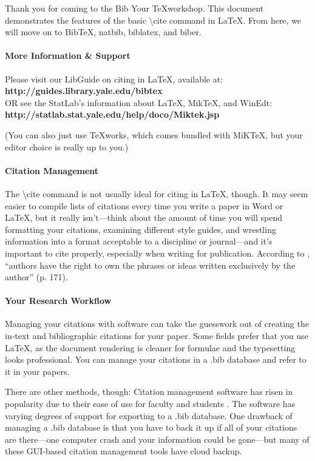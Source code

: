 \documentclass[12pt]{report}
\begin{document}
Thank you for coming to the Bib Your \TeX \space workshop. This document demonstrates the features of the basic \textbackslash cite command in \LaTeX. From here, we will move on to Bib\TeX, natbib, biblatex, and biber. 

\paragraph{More Information \& Support}
Please visit our LibGuide on citing in La\TeX, available at:
\\ \textbf{http://guides.library.yale.edu/bibtex}
\\ OR
see the StatLab's information about \LaTeX, Mik\TeX, and WinEdt:
\\ \textbf{http://statlab.stat.yale.edu/help/doco/Miktek.jsp}

(You can also just use \TeX works, which comes bundled with MiK\TeX, but your editor choice is really up to you.)

\paragraph{Citation Management}

The \textbackslash cite command is not usually ideal for citing in \LaTeX, though. It may seem easier to compile lists of citations every time you write a paper in Word or \LaTeX, but it really isn't---think about the amount of time you will spend formatting your citations, examining different style guides, and wrestling information into a format acceptable to a discipline or journal---and it's important to cite properly, especially when writing for publication. According to \cite{Mundava2007}, ``authors have the right to own the phrases or ideas written exclusively by the author'' (p. 171).

\paragraph{Your Research Workflow}

Managing your citations with software can take the guesswork out of creating the in-text and bibliographic citations for your paper. Some fields prefer that you use \LaTeX, as the document rendering is cleaner for formulae and the typesetting looks professional. You can manage your citations in a .bib database and refer to it in your papers. 

There are other methods, though: Citation management software has risen in popularity due to their ease of use for faculty and students \cite{Hensley2011}. The software has varying degrees of support for exporting to a .bib database. One drawback of managing a .bib database is that you have to back it up if all of your citations are there---one computer crash and your information could be gone---but many of these GUI-based citation management tools have cloud backup.
\end{document}
